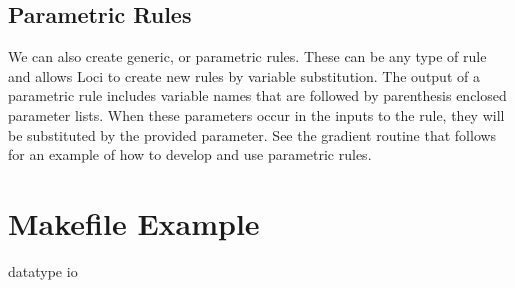 \documentclass[10pt,epsf]{book}
\begin{document}


\section{Parametric Rules}

We can also create generic, or parametric rules.  These can be any
type of rule and allows Loci to create new rules by variable
substitution.  The output of a parametric rule includes variable names
that are followed by parenthesis enclosed parameter lists.  When these
parameters occur in the inputs to the rule, they will be substituted
by the provided parameter.  See the gradient routine that follows for
an example of how to develop and use parametric rules.




\appendix

\chapter { Makefile Example}
\label{chap:makefile}



 {datatype}
 {io}


%
\end{document}
